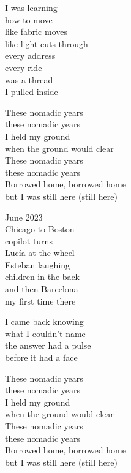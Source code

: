 \begin{lyrics}
I was learning\\
how to move\\
like fabric moves\\
like light cuts through\\
every address\\
every ride\\
was a thread\\
I pulled inside

These nomadic years\\
these nomadic years\\
I held my ground\\
when the ground would clear\\
These nomadic years\\
these nomadic years\\
Borrowed home, borrowed home\\
but I was still here (still here)

June 2023\\
Chicago to Boston\\
copilot turns\\
Lucía at the wheel\\
Esteban laughing\\
children in the back\\
and then Barcelona\\
my first time there

I came back knowing\\
what I couldn't name\\
the answer had a pulse\\
before it had a face

These nomadic years\\
these nomadic years\\
I held my ground\\
when the ground would clear\\
These nomadic years\\
these nomadic years\\
Borrowed home, borrowed home\\
but I was still here (still here)
\end{lyrics}

